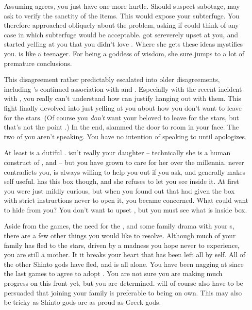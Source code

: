 \documentclass[char]{guardians}
\begin{document}
Assuming \cOsiris{} agrees, you just have one more hurtle. Should \cZeus{} suspect sabotage, \cZeus{\they} may ask \cAthena{} to verify the sanctity of the items. This would expose your subterfuge. You therefore approached \cAthena{} obliquely about the problem, asking if \cAthena{\they} could think of any case in which subterfuge would be acceptable. \cAthena{} got sereverely upset at you, and started yelling at you that you didn't love \cZeus{}. Where she gets these ideas mystifies you. \cAthena{\They} is like a teenager. For being a goddess of wisdom, she sure jumps to a lot of premature conclusions.

This disagreement rather predictably escalated into older disagreements, including \cAthena{}'s continued association with \cVal{} and \cFenrir{}. Especially with the recent incident with \cVal{}, you really can't understand how \cAthena{} can justify hanging out with them.  This fight finally devolved into \cAthena{} just yelling at you about how you don't want \cAthena{\them} to leave for the stars. (Of course you \emph{don't} want your beloved \cAthena{\offspring} to leave for the stars, but that's not the point .) In the end, \cAthena{} slammed the door to \cAthena{\them} room in your face. The two of you aren't speaking. You have no intention of speaking to \cAthena{\them} until \cAthena{\they} apologizes.

At least \cPandora{} is a dutiful \cPandora{\offspring}. \cPandora{\They} isn't really your daughter -- technically she is a human construct of \cAthena{}, \cHephaestus{} and \cZeus{} -- but you have grown to care for her over the millennia. \cPandora{} never contradicts you, \cPandora{\they} is always willing to help you out if you ask, and generally makes \cPandora{\them}self useful. \cPandora{\They} has this box though, and she refuses to let you see inside it. At first you were just mildly curious, but when you found out that \cZeus{} had given \cPandora{\them} the box with strict instructions never to open it, you became concerned. What could \cZeus{} want to hide from you? You don't want to upset \cPandora{}, but you must see what is inside \cPandora{\them} box.

Aside from the games, the need for the \stone{}, and some family drama with your \cAthena{\offspring}s, there are a few other things you would like to resolve. Although much of your family has fled to the stars, driven by a madness you hope never to experience, you are still a mother. It it breaks your heart that \cAmaterasu{} has been left all by \cAmaterasu{\them}self. All of the other Shinto gods have fled, and \cAmaterasu{\they} is all alone. You have been nagging at \cZeus{} since the last games to agree to adopt \cAmaterasu{}. You are not sure you are making much progress on this front yet, but you are determined. \cAmaterasu{} will of course also have to be persuaded that joining your family is preferable to being on \cAmaterasu{\them} own. This may also be tricky as Shinto gods are as proud as Greek gods.
\end{document}
